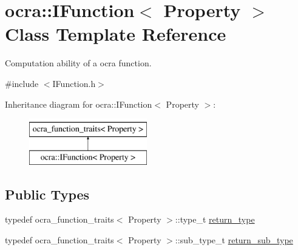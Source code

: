 \hypertarget{classocra_1_1IFunction}{}\section{ocra\+:\+:I\+Function$<$ Property $>$ Class Template Reference}
\label{classocra_1_1IFunction}


Computation ability of a ocra function.  




{\ttfamily \#include $<$I\+Function.\+h$>$}

Inheritance diagram for ocra\+:\+:I\+Function$<$ Property $>$\+:\begin{figure}[H]
\begin{center}
\leavevmode
\includegraphics[height=2.000000cm]{d1/d71/classocra_1_1IFunction}
\end{center}
\end{figure}
\subsection*{Public Types}
{\bf }\par
\begin{DoxyCompactItemize}
\item 
typedef ocra\+\_\+function\+\_\+traits$<$ Property $>$\+::type\+\_\+t \hyperlink{classocra_1_1IFunction_a04d351c2f938d01046328b54fb7e6525}{return\+\_\+type}
\item 
typedef ocra\+\_\+function\+\_\+traits$<$ Property $>$\+::sub\+\_\+type\+\_\+t \hyperlink{classocra_1_1IFunction_ac6604adbd04613e1f545fb522cedbe3d}{return\+\_\+sub\+\_\+type}
\end{DoxyCompactItemize}

